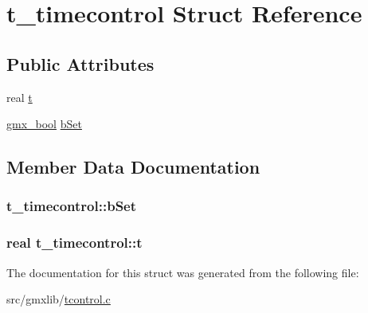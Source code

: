 \hypertarget{structt__timecontrol}{\section{t\-\_\-timecontrol \-Struct \-Reference}
\label{structt__timecontrol}
}
\subsection*{\-Public \-Attributes}
\begin{DoxyCompactItemize}
\item 
real \hyperlink{structt__timecontrol_ade1886e8fee405d2b5880276835eb14c}{t}
\item 
\hyperlink{include_2types_2simple_8h_a8fddad319f226e856400d190198d5151}{gmx\-\_\-bool} \hyperlink{structt__timecontrol_a7cce6a48502fe56b653bcb6cbd1a816f}{b\-Set}
\end{DoxyCompactItemize}


\subsection{\-Member \-Data \-Documentation}
\hypertarget{structt__timecontrol_a7cce6a48502fe56b653bcb6cbd1a816f}{
\subsubsection[{b\-Set}]{ {\bf t\-\_\-timecontrol\-::b\-Set}}}\label{structt__timecontrol_a7cce6a48502fe56b653bcb6cbd1a816f}
\hypertarget{structt__timecontrol_ade1886e8fee405d2b5880276835eb14c}{
\subsubsection[{t}]{\setlength{\rightskip}{0pt plus 5cm}real {\bf t\-\_\-timecontrol\-::t}}}\label{structt__timecontrol_ade1886e8fee405d2b5880276835eb14c}


\-The documentation for this struct was generated from the following file\-:\begin{DoxyCompactItemize}
\item 
src/gmxlib/\hyperlink{tcontrol_8c}{tcontrol.\-c}\end{DoxyCompactItemize}
